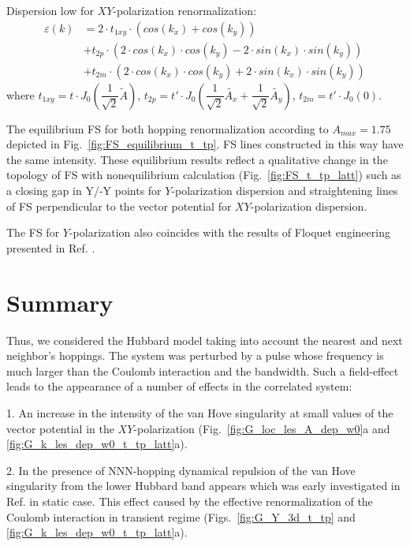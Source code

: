 Dispersion low for $XY$-polarization renormalization:
\begin{equation}
\begin{split}
 \varepsilon(k)&=2 \cdot t_{1xy} \cdot (cos(k_x)+cos(k_y))\\
 &+t_{2p} \cdot (2 \cdot cos(k_x)\cdot cos(k_y)-2 \cdot sin(k_x)\cdot sin(k_y)) \\
 &+t_{2m} \cdot (2 \cdot cos(k_x)\cdot cos(k_y)+2 \cdot sin(k_x)\cdot sin(k_y))
\end{split}
\label{dispersion_3}
\end{equation}
where $t_{1xy}=t \cdot J_0(\dfrac{1}{\sqrt{2}} \tilde{A})$, $t_{2p}=t' \cdot J_0(\dfrac{1}{\sqrt{2}} \tilde{A_x}+\dfrac{1}{\sqrt{2}} \tilde{A_y})$, $t_{2m}=t' \cdot J_0(0)$.


The equilibrium FS for both hopping renormalization according to $A_{max}=1.75$ depicted in Fig.~\ref{fig:FS_equilibrium_t_tp}. FS lines constructed in this way have the same intensity.
These equilibrium results reflect a qualitative change in the topology of FS with nonequilibrium calculation (Fig.~\ref{fig:FS_t_tp_latt}) such as a closing gap in Y/-Y points for $Y$-polarization dispersion and straightening lines of FS perpendicular to the vector potential for $XY$-polarization dispersion.

The FS for $Y$-polarization also coincides with the results of Floquet engineering presented in Ref. \cite{PhysRevB.100.075115}.


\FloatBarrier

\section{Summary}

Thus, we considered the Hubbard model taking into account the nearest and next neighbor's hoppings. The system was perturbed by a pulse whose frequency is much larger than the Coulomb interaction and the bandwidth. 
Such a field-effect leads to the appearance of a number of effects in the correlated system:

1. An increase in the intensity of the van Hove singularity at small values of the vector potential in the $XY$-polarization (Fig.~\ref{fig:G_loc_les_A_dep_w0}a and \ref{fig:G_k_les_dep_w0_t_tp_latt}a).

2. In the presence of NNN-hopping dynamical repulsion of the van Hove singularity from the lower Hubbard band appears which was early investigated in Ref. \cite{PhysRevB.54.12505} in static case. This effect caused by the effective renormalization of the Coulomb interaction \cite{PhysRevLett.106.236401} in transient regime (Figs.~\ref{fig:G_Y_3d_t_tp} and \ref{fig:G_k_les_dep_w0_t_tp_latt}a).

